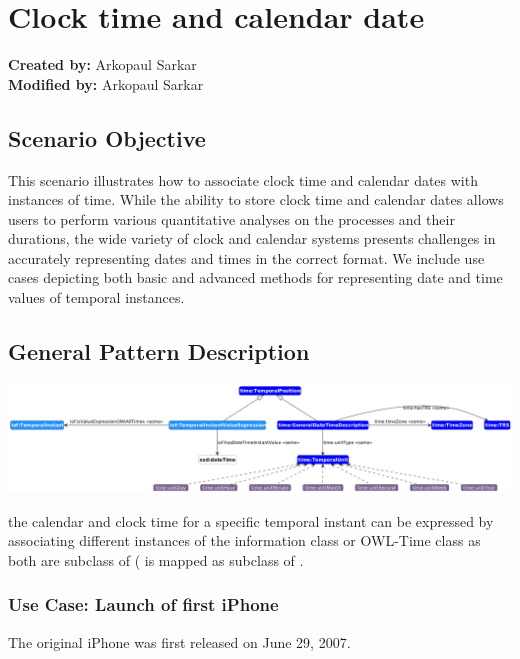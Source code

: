 \section{Clock time and calendar date}
\label{sec-clock-calendar}

\textbf{Created by:} Arkopaul Sarkar \\
\textbf{Modified by:} Arkopaul Sarkar \\

\subsection*{Scenario Objective}

This scenario illustrates how to associate clock time and calendar dates with instances of time. While the ability to store clock time and calendar dates allows users to perform various quantitative analyses on the processes and their durations, the wide variety of clock and calendar systems presents challenges in accurately representing dates and times in the correct format. We include use cases depicting both basic and advanced methods for representing date and time values of temporal instances.


\subsection*{General Pattern Description}

\includegraphics[scale=0.28]{scenarios/clock-time-calendar-date/images/general-clock-calendar.png}

the calendar and clock time for a specific temporal instant can be expressed by associating different instances of the information class  or OWL-Time class  as both are subclass of  ( is mapped as subclass of .  

\subsubsection*{Use Case: Launch of first iPhone} 
The original iPhone was first released on June 29, 2007. 

